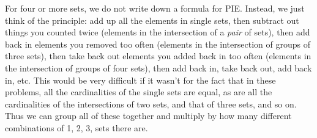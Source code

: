 \documentclass[10pt,]{book}
\theoremstyle{plain}
\theoremstyle{definition}
\theoremstyle{definition}
\theoremstyle{definition}
\theoremstyle{definition}
\numberwithin{equation}{chapter}
\begin{document}
\hypertarget{p-847}{}%
For four or more sets, we do not write down a formula for PIE. Instead, we just think of the principle: add up all the elements in single sets, then subtract out things you counted twice (elements in the intersection of a \emph{pair} of sets), then add back in elements you removed too often (elements in the intersection of groups of three sets), then take back out elements you added back in too often (elements in the intersection of groups of four sets), then add back in, take back out, add back in, etc. This would be very difficult if it wasn't for the fact that in these problems, all the cardinalities of the single sets are equal, as are all the cardinalities of the intersections of two sets, and that of three sets, and so on. Thus we can group all of these together and multiply by how many different combinations of 1, 2, 3, \textellipsis{} sets there are.%
\end{document}
